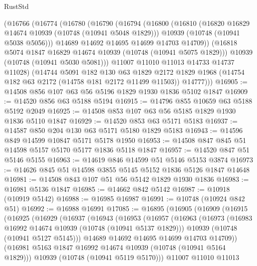 \begin{lexlean}{RustStd}
\begin{coremodule}
    (@16766
      (@16774
        (@16780
          (@16790
            (@16794
              (@16800
                (@16810
                  (@16820 @16829 @14674 @10939 (@10748 (@10941 @5048 @1829)))
                  @10939
                  (@10748 (@10941 @5038 @5056)))
                @14689
                @14692
                @14695
                @14699
                @14703
                @14709))
            (@16818 @5074 @1847 @16829 @14674 @10939 (@10748 (@10941 @5075 @1829)))
            @10939
            (@10748 (@10941 @5030 @5081)))
          @11007
          @11010
          @11013
          @14733
          @14737
          @11028)
        (@14744
          @5091
          @182
          @130
          @63
          @1829
          @2172
          @1829
          @1968
          (@14754 @182 @63 @2172 (@14758 @181 @2172 @11499 @11503))
          @14777)))
@16905 := @14508 @856 @107 @63 @56 @5196 @1829 @1930 @1836 @5102 @1847
@16909 := @14520 @856 @63 @5188 @5194
@16915 := @14796 @855 @10659 @63 @5188 @5192 @2049
@16925 := @14508 @853 @107 @63 @56 @5185 @1829 @1930 @1836 @5110 @1847
@16929 := @14520 @853 @63 @5171 @5183
@16937 := @14587 @850 @204 @130 @63 @5171 @5180 @1829 @5183
@16943 := @14596 @849 @14599 @10847 @5171 @5178 @1950
@16953 := @14508 @847 @845 @51 @14598 @5157 @5170 @5177 @1836 @5118 @1847
@16957 := @14520 @847 @51 @5146 @5155
@16963 := @14619 @846 @14599 @51 @5146 @5153 @3874
@16973 := @14626 @845 @51 @14598 @3855 @5145 @5152 @1836 @5126 @1847 @14648
@16981 := @14508 @843 @107 @51 @56 @5142 @1829 @1930 @1836
@16983 := @16981 @5136 @1847
@16985 := @14662 @842 @5142
@16987 := @10918 (@10919 @5142)
@16988 := @16985 @16987
@16991 := @10748 (@10924 @842 @51)
@16992 := @16988 @16991
@17085 := @16895
    (@16905
      (@16909
        (@16915
          (@16925
            (@16929
              (@16937
                (@16943
                  (@16953
                    (@16957
                      (@16963
                        (@16973
                          (@16983 @16992 @14674 @10939 (@10748 (@10941 @5137 @1829)))
                          @10939
                          (@10748 (@10941 @5127 @5145)))
                        @14689
                        @14692
                        @14695
                        @14699
                        @14703
                        @14709))
                    (@16981 @5163 @1847 @16992 @14674 @10939 (@10748 (@10941 @5164 @1829)))
                    @10939
                    (@10748 (@10941 @5119 @5170)))
                  @11007
                  @11010
                  @11013

\end{coremodule}
\end{lexlean}
